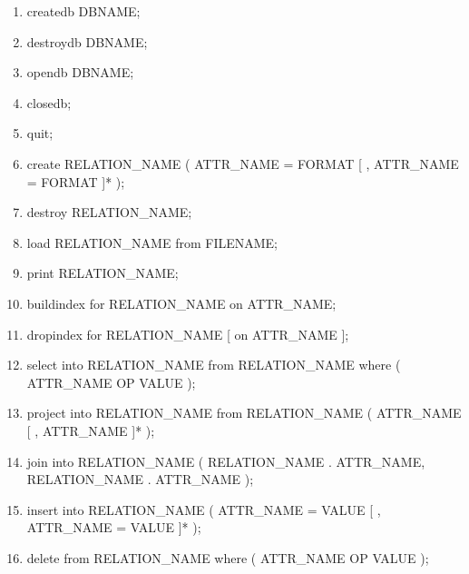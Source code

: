 \begin{center}
\begin{tt}
\begin{enumerate}
\item createdb DBNAME;
\item destroydb DBNAME;
\item opendb DBNAME;
\item closedb;
\item quit;
\item create RELATION\_NAME ( ATTR\_NAME = FORMAT [ , ATTR\_NAME = FORMAT ]* );
\item destroy RELATION\_NAME;
\item load RELATION\_NAME from FILENAME;
\item print RELATION\_NAME;
\item buildindex for RELATION\_NAME on ATTR\_NAME;
\item dropindex for RELATION\_NAME [ on ATTR\_NAME ];
\item select into RELATION\_NAME from RELATION\_NAME where ( ATTR\_NAME OP VALUE );
\item project into RELATION\_NAME from RELATION\_NAME ( ATTR\_NAME [ , ATTR\_NAME ]* );
\item join into RELATION\_NAME ( RELATION\_NAME . ATTR\_NAME, RELATION\_NAME . ATTR\_NAME );
\item insert into RELATION\_NAME ( ATTR\_NAME = VALUE [ , ATTR\_NAME = VALUE ]* );
\item delete from RELATION\_NAME where ( ATTR\_NAME OP VALUE );
\end{enumerate}
\end{tt}
\end{center}


